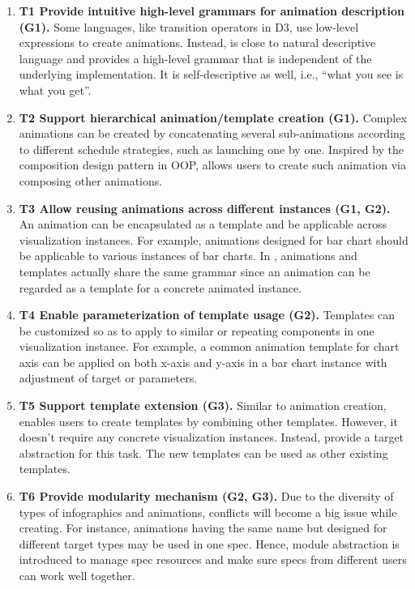 \begin{enumerate}

\item \textbf{T1 Provide intuitive high-level grammars for animation description (G1).}
Some languages, like transition operators in D3, use low-level expressions to create animations. 
Instead, \gaia{} is close to natural descriptive language and provides a high-level grammar that is independent of the underlying implementation.
It is self-descriptive as well, i.e., “what you see is what you get”.

\item \textbf{T2 Support hierarchical animation/template creation (G1).}
Complex animations can be created by concatenating several sub-animations according to different schedule strategies, such as launching one by one. 
Inspired by the composition design pattern in OOP, \gaia{} allows users to create such animation via composing other animations. 

\item \textbf{T3 Allow reusing animations across different instances (G1, G2).}
An animation can be encapsulated as a template and be applicable across visualization instances. 
For example, animations designed for bar chart should be applicable to various instances of bar charts. 
In \gaia{}, animations and templates actually share the same grammar since an animation can be regarded as a template for a concrete animated instance.

\item \textbf{T4 Enable parameterization of template usage (G2).}
Templates can be customized so as to apply to similar or repeating components in one visualization instance. 
For example, a common animation template for chart axis can be applied on both x-axis and y-axis in a bar chart instance with adjustment of target or parameters.

\item \textbf{T5 Support template extension (G3).}
Similar to animation creation, \gaia{} enables users to create templates by combining other templates. 
However, it doesn’t require any concrete visualization instances. 
Instead, \gaia{} provide a target abstraction for this task. 
The new templates can be used as other existing templates.

\item \textbf{T6 Provide modularity mechanism (G2, G3).}
Due to the diversity of types of infographics and animations, conflicts will become a big issue while creating. 
For instance, animations having the same name but designed for different target types may be used in one spec. 
Hence, module abstraction is introduced to manage spec resources and make sure specs from different users can work well together.

\end{enumerate}
